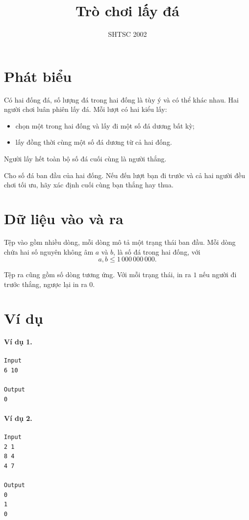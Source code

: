 \documentclass[11pt]{article}
\title{Trò chơi lấy đá}
\author{SHTSC 2002}
\date{}
\begin{document}
\maketitle


\section{Phát biểu}

Có hai đống đá, số lượng đá trong hai đống là tùy ý và có thể khác nhau. Hai
người chơi luân phiên lấy đá. Mỗi lượt có hai kiểu lấy:
\begin{itemize}
  \item chọn một trong hai đống và lấy đi một số đá dương bất kỳ;
  \item lấy đồng thời cùng một số đá dương từ cả hai đống.
\end{itemize}
Người lấy hết toàn bộ số đá cuối cùng là người thắng.

Cho số đá ban đầu của hai đống. Nếu đến lượt bạn đi trước và cả hai người đều
chơi tối ưu, hãy xác định cuối cùng bạn thắng hay thua.

\section{Dữ liệu vào và ra}

Tệp vào gồm nhiều dòng, mỗi dòng mô tả một trạng thái ban đầu. Mỗi dòng chứa
hai số nguyên không âm \(a\) và \(b\), là số đá trong hai đống, với
\[
  a,b\le 1\,000\,000\,000.
\]

Tệp ra cũng gồm số dòng tương ứng. Với mỗi trạng thái, in ra \(1\) nếu người
đi trước thắng, ngược lại in ra \(0\).

\section{Ví dụ}

\paragraph{Ví dụ 1.}
\begin{verbatim}
Input
6 10

Output
0
\end{verbatim}

\paragraph{Ví dụ 2.}
\begin{verbatim}
Input
2 1
8 4
4 7

Output
0
1
0
\end{verbatim}
\end{document}

